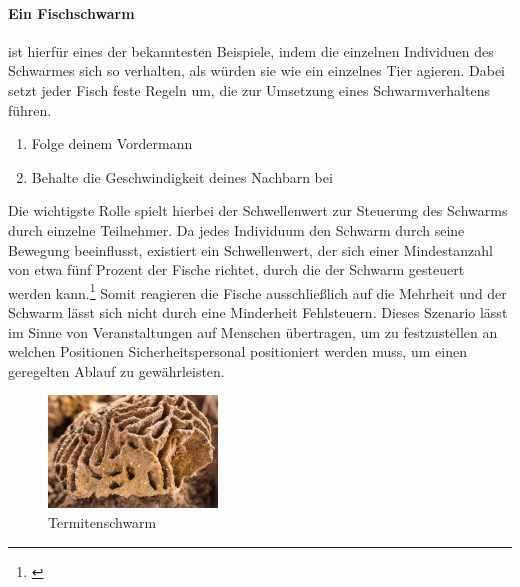 \paragraph{Ein Fischschwarm}
ist hierfür eines der bekanntesten Beispiele, indem die einzelnen Individuen des Schwarmes sich so verhalten, als würden sie wie ein einzelnes Tier agieren. Dabei setzt jeder Fisch feste Regeln um, die zur Umsetzung eines Schwarmverhaltens führen.
\begin{enumerate}
	\item Folge deinem Vordermann
	\item Behalte die Geschwindigkeit deines Nachbarn bei
\end{enumerate}
\noindent
Die wichtigste Rolle spielt hierbei der Schwellenwert zur Steuerung des Schwarms durch einzelne Teilnehmer. Da jedes Individuum den Schwarm durch seine Bewegung beeinflusst, existiert ein Schwellenwert, der sich einer Mindestanzahl von etwa fünf Prozent der Fische richtet, durch die der Schwarm gesteuert werden kann.\footnote{\citep[vgl.][Logistik Schwarmintelligenz]{Stober.Logistik:Schwarmintelligenz}\label{note47}} Somit reagieren die Fische ausschließlich auf die Mehrheit und der Schwarm lässt sich nicht durch eine Minderheit Fehlsteuern. Dieses Szenario lässt im Sinne von Veranstaltungen auf Menschen übertragen, um zu festzustellen an welchen Positionen Sicherheitspersonal positioniert werden muss, um einen geregelten Ablauf zu gewährleisten.
\begin{figure}
	\begin{center}
		\includegraphics[width=0.4\textwidth]{images/technische_grundlagen/termitenschwarm.jpg}
	\end{center}
	\caption{Termitenschwarm}
	\label{fig:termitenschwarm}
\end{figure}

\noindent
